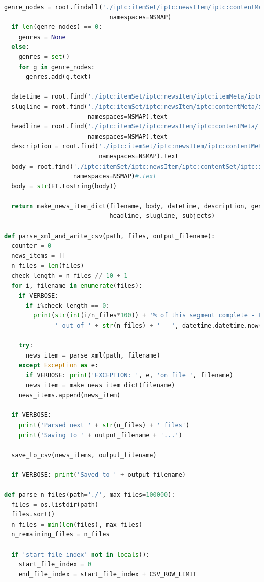 \documentclass[11pt]{article}
\begin{document}
\begin{lstlisting}[language=Python, basicstyle=\tiny]
  genre_nodes = root.findall('./iptc:itemSet/iptc:newsItem/iptc:contentMeta/iptc:genre/iptc:name',\
                             namespaces=NSMAP)
  if len(genre_nodes) == 0:
    genres = None
  else:
    genres = set()
    for g in genre_nodes:
      genres.add(g.text)

  datetime = root.find('./iptc:itemSet/iptc:newsItem/iptc:itemMeta/iptc:firstCreated', namespaces=NSMAP).text
  slugline = root.find('./iptc:itemSet/iptc:newsItem/iptc:contentMeta/iptc:slugline',\
                       namespaces=NSMAP).text
  headline = root.find('./iptc:itemSet/iptc:newsItem/iptc:contentMeta/iptc:headline',\
                       namespaces=NSMAP).text
  description = root.find('./iptc:itemSet/iptc:newsItem/iptc:contentMeta/iptc:description',\
                          namespaces=NSMAP).text
  body = root.find('./iptc:itemSet/iptc:newsItem/iptc:contentSet/iptc:inlineXML/xhtml:html/xhtml:body',\
                   namespaces=NSMAP)#.text
  body = str(ET.tostring(body))

  return make_news_item_dict(filename, body, datetime, description, genres, guid,\
                             headline, slugline, subjects)

def parse_xml_and_write_csv(path, files, output_filename):
  counter = 0
  news_items = []
  n_files = len(files)
  check_length = n_files // 10 + 1
  for i, filename in enumerate(files):
    if VERBOSE:
      if i%check_length == 0:
        print(str(int(i/n_files*100)) + '% of this segment complete - Parsing file ' + str(i) + \
              ' out of ' + str(n_files) + ' - ', datetime.datetime.now())

    try:
      news_item = parse_xml(path, filename)
    except Exception as e:
      if VERBOSE: print('EXCEPTION: ', e, 'on file ', filename)
      news_item = make_news_item_dict(filename)
    news_items.append(news_item)

  if VERBOSE:
    print('Parsed next ' + str(n_files) + ' files')
    print('Saving to ' + output_filename + '...')

  save_to_csv(news_items, output_filename)

  if VERBOSE: print('Saved to ' + output_filename)

def parse_n_files(path='./', max_files=100000):
  files = os.listdir(path)
  files.sort()
  n_files = min(len(files), max_files)
  n_remaining_files = n_files

  if 'start_file_index' not in locals():
    start_file_index = 0
    end_file_index = start_file_index + CSV_ROW_LIMIT


\end{lstlisting}
\end{document}
